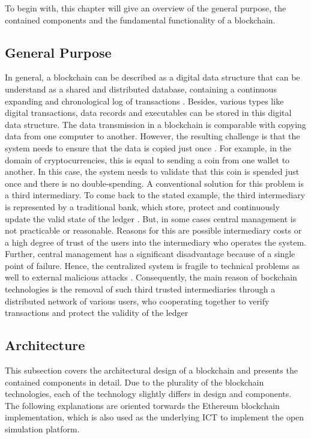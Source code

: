 To begin with, this chapter will give an overview of the general purpose, the contained components and the fundamental functionality of a blockchain. 

\subsection{General Purpose}
In general, a blockchain can be described as a digital data structure that can be understand as a shared and distributed database, containing a continuous expanding and chronological log of transactions \cite{andoni2019blockchain}. Besides, various types like digital transactions, data records and executables can be stored in this digital data structure. The data transmission in a blockchain is comparable with copying data from one computer to another. However, the resulting challenge is that the system needs to ensure that the data is copied just once \cite{andoni2019blockchain}. For example, in the domain of cryptocurrencies, this is equal to sending a coin from one wallet to another. In this case, the system needs to validate that this coin is spended just once and there is no double-spending. A conventional solution for this problem is a third intermediary. To come back to the stated example, the third intermediary is represented by a traditional bank, which store, protect and continuously update the valid state of the ledger \cite{andoni2019blockchain}. But, in some cases central management is not practicable or reasonable. Reasons for this are possible intermediary costs or a high degree of trust of the users into the intermediary who operates the system. Further, central management has a significant disadvantage because of a single point of failure. Hence, the centralized system is fragile to technical problems as well to external malicious attacks \cite{andoni2019blockchain}.
Consequently, the main reason of bockchain technologies is the removal of such third trusted intermediaries through a distributed network of various users, who cooperating together to verify transactions and protect the validity of the ledger

\subsection{Architecture}
This subsection covers the architectural design of a blockchain and presents the contained components in detail. Due to the plurality of the blockchain technologies, each of the technology slightly differs in design and components. The following explanations are oriented torwards the Ethereum blockchain implementation, which is also used as the underlying ICT to implement the open simulation platform.

